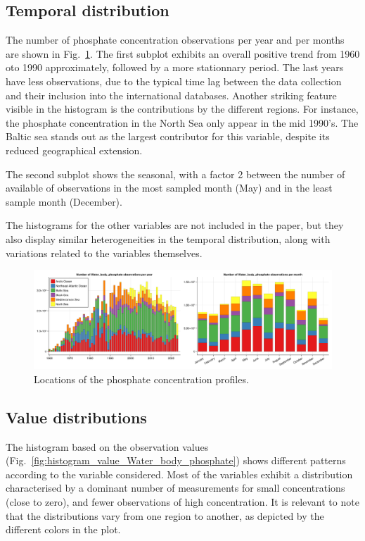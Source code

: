\documentclass[essd, manuscript]{copernicus}
\begin{document}
\subsection{Temporal distribution}

The number of phosphate concentration observations per year and per months are shown in Fig.~\ref{fig:phosphatetime}. The first subplot exhibits an overall positive trend from 1960 oto 1990 approximately, followed by a more stationnary period. The last years have less observations, due to the typical time lag between the data collection and their inclusion into the international databases. Another striking feature visible in the histogram is the contributions by the different regions. For instance, the phosphate concentration in the North Sea only appear in the mid 1990's. The Baltic sea stands out as the largest contributor for this variable, despite its reduced geographical extension.

The second subplot shows the seasonal, with a factor 2 between the number of available of observations in the most sampled month (May) and in the least sample month (December). 

The histograms for the other variables are not included in the paper, but they also display similar heterogeneities in the temporal distribution, along with variations related to the variables themselves. 

\begin{figure}[t]
\includegraphics[width=\textwidth]{stacked_histogram_Water_body_phosphate.png}
\caption{Locations of the phosphate concentration profiles.\label{fig:phosphatetime}}
\end{figure}


\subsection{Value distributions}

The histogram based on the observation values (Fig.~\ref{fig:histogram_value_Water_body_phosphate}) shows different patterns according to the variable considered. Most of the variables exhibit a distribution characterised by a dominant number of measurements for small concentrations (close to zero), and fewer observations of high concentration. It is relevant to note that the distributions vary from one region to another, as depicted by the different colors in the plot.  
\end{document}
